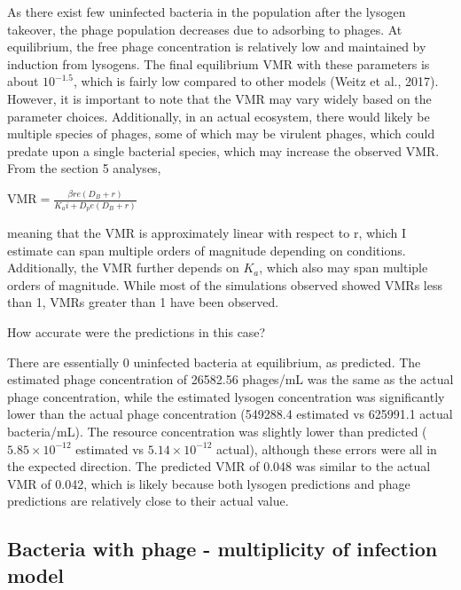 \documentclass{article}
\begin{document}
As there exist few uninfected bacteria in the population after the lysogen takeover, the phage population decreases due to adsorbing to phages. At equilibrium, the free phage concentration is relatively low and maintained by induction from lysogens. The final equilibrium VMR with these parameters is about $10^{-1.5}$, which is fairly low compared to other models (Weitz et al., 2017). However, it is important to note that the VMR may vary widely based on the parameter choices. Additionally, in an actual ecosystem, there would likely be multiple species of phages, some of which may be virulent phages, which could predate upon a single bacterial species, which may increase the observed VMR. From the section 5 analyses, 

\begin{center}$
\text{VMR} = \frac{\beta r e (D_B + r)}{K_a i + D_pe (D_B + r)}$
\end{center}
meaning that the VMR is approximately linear with respect to r, which I estimate can span multiple orders of magnitude depending on conditions. Additionally, the VMR further depends on $K_a$, which also may span multiple orders of magnitude. While most of the simulations observed showed VMRs less than 1, VMRs greater than 1 have been observed.

How accurate were the predictions in this case?

There are essentially 0 uninfected bacteria at equilibrium, as predicted. The estimated phage concentration of 26582.56 phages/mL was the same as the actual phage concentration, while the estimated lysogen concentration was significantly lower than the actual phage concentration (549288.4 estimated vs 625991.1 actual bacteria/mL). The resource concentration was slightly lower than predicted ($5.85 \times 10^{-12}$ estimated vs $5.14 \times 10^{-12}$ actual), although these errors were all in the expected direction. The predicted VMR of 0.048 was similar to the actual VMR of 0.042, which is likely because both lysogen predictions and phage predictions are relatively close to their actual value.

\subsection{Bacteria with phage - multiplicity of infection model}
\end{document}
